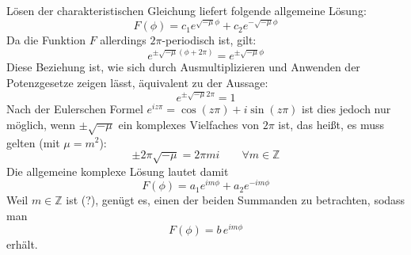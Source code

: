 \documentclass[9pt]{report}
\begin{document}
Lösen der charakteristischen Gleichung liefert folgende allgemeine Lösung:
\begin{equation}
F(\phi)=c_{1}e^{\sqrt{-\mu}\phi}+c_{2}e^{-\sqrt{-\mu}\phi}
\end{equation}
Da die Funktion $F$ allerdings $2\pi$-periodisch ist, gilt:
\begin{equation}
e^{\pm\sqrt{-\mu}(\phi+2\pi)}=e^{\pm\sqrt{-\mu}\phi}
\end{equation}
Diese Beziehung ist, wie sich durch Ausmultiplizieren und Anwenden der Potenzgesetze zeigen lässt, äquivalent zu der Aussage:
\begin{equation}
e^{\pm\sqrt{-\mu}2\pi}=1
\end{equation}
Nach der Eulerschen Formel $e^{iz\pi}=\cos(z\pi)+i\sin(z\pi)$ ist dies jedoch nur möglich, wenn $\pm\sqrt{-\mu}$ ein komplexes Vielfaches von $2\pi$ ist, das heißt, es muss gelten (mit $\mu=m^2$):
\begin{equation}
\pm 2\pi\sqrt{-\mu}=2\pi mi\qquad\forall m\in\mathbb{Z}
\end{equation}
Die allgemeine komplexe Lösung lautet damit
\begin{equation}
F(\phi)=a_{1}e^{im\phi}+a_{2}e^{-im\phi}
\end{equation}
Weil $m\in\mathbb{Z}$ ist (?), genügt es, einen der beiden Summanden zu betrachten, sodass man
\begin{equation}
F(\phi)=b\,e^{im\phi}
\end{equation}
erhält.
\end{document}
